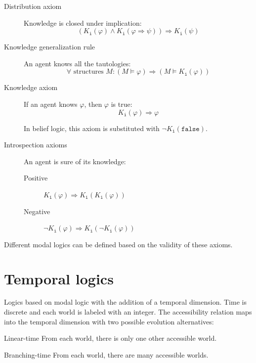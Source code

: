 \begin{description}
\begin{description}
            \item[Distribution axiom] 
                Knowledge is closed under implication:
                \[ (K_\texttt{i}(\varphi) \land K_\texttt{i}(\varphi \Rightarrow \psi)) \Rightarrow K_\texttt{i}(\psi) \]

            \item[Knowledge generalization rule] 
                An agent knows all the tautologies:
                \[ \forall \text{ structures } M: (M \models \varphi) \Rightarrow (M \models K_\texttt{i}(\varphi)) \]

            \item[Knowledge axiom] 
                If an agent knows $\varphi$, then $\varphi$ is true:
                \[ K_\texttt{i}(\varphi) \Rightarrow \varphi \]

                In belief logic, this axiom is substituted with $\lnot K_\texttt{i}(\texttt{false})$.

            \item[Introspection axioms]
                An agent is sure of its knowledge:
                \begin{description}
                    \item[Positive] $K_\texttt{i}(\varphi) \Rightarrow K_\texttt{i}(K_\texttt{i}(\varphi))$ 
                    \item[Negative] $\lnot K_\texttt{i}(\varphi) \Rightarrow K_\texttt{i}(\lnot K_\texttt{i}(\varphi))$ 
                \end{description}
        \end{description}
        
        Different modal logics can be defined based on the validity of these axioms.
\end{description}



\section{Temporal logics}

Logics based on modal logic with the addition of a temporal dimension.
Time is discrete and each world is labeled with an integer. 
The accessibility relation maps into the temporal dimension with two possible evolution alternatives:
\begin{descriptionlist}
    \item[Linear-time] 
        From each world, there is only one other accessible world.
    
    \item[Branching-time] 
        From each world, there are many accessible worlds.
\end{descriptionlist}




